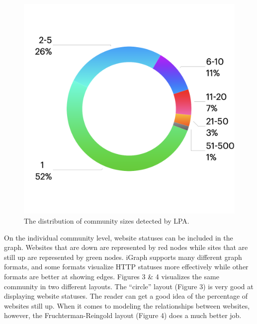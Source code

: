 \documentclass[conference]{IEEEtran}
\begin{document}
\begin{figure}[htbp]
 \centerline{\includegraphics[width=\columnwidth]{CommunitySizeDistribution.png}}
 \caption{The distribution of community sizes detected by LPA.}
\end{figure}

On the individual community level, website statuses can be included in the graph. Websites that are down are represented by red nodes while sites that are still up are represented by green nodes. iGraph supports many different graph formats, and some formats visualize HTTP statuses more effectively while other formats are better at showing edges. Figures 3 \& 4 visualizes the same community in two different layouts. The “circle” layout (Figure 3) is very good at displaying website statuses. The reader can get a good idea of the percentage of websites still up. When it comes to modeling the relationships between websites, however, the Fruchterman-Reingold layout \cite{fruchterman1991graph}(Figure 4) does a much better job.
\end{document}
